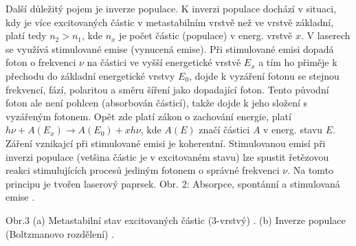 \documentclass[a4paper,12pt]{article}
\begin{document}
Další důležitý pojem je inverze populace. K inverzi populace dochází v situaci, kdy je více excitovaných částic v metastabilním vrstvě než ve vrstvě základní, platí tedy $n_2 > n_1$, kde $n_x$ je počet částic (populace) v energ. vrstvě $x$.
V laserech se využívá stimulované emise (vynucená emise). Při stimulované emisi dopadá foton o frekvenci $\nu$ na částici ve vyšší energetické vrstvě $E_x$ a tím ho přiměje k přechodu do základní energetické vrstvy $E_0$, dojde k vyzáření fotonu se stejnou frekvencí, fází, polaritou a směru šíření jako dopadající foton. Tento původní foton ale není pohlcen (absorbován částicí), takže dojde k jeho složení s vyzářeným fotonem. Opět zde platí zákon o zachování energie, platí $h\nu + A(E_x) \rightarrow A(E_0) + xh\nu$, kde $A(E)$ značí částici $A$ v energ. stavu $E$. Záření vznikajcí při stimulované emisi je koherentní. Stimulovanou emisí při inverzi populace (vetšina částic je v excitovaném stavu) lze spustit řetězovou reakci stimulujících procesů jediným fotonem o správné frekvenci $\nu$.
Na tomto principu je tvořen laserový paprsek.
Obr. 2: Absorpce, spontánní a stimulovaná emise \cite{hrw, p. 1097}.

Obr.3 (a) Metastabilní stav excitovaných částic (3-vrstvý) \cite{optics, p. 351}.
(b) Inverze populace (Boltzmanovo rozdělení) \cite{optics, p. 358}.
\end{document}
